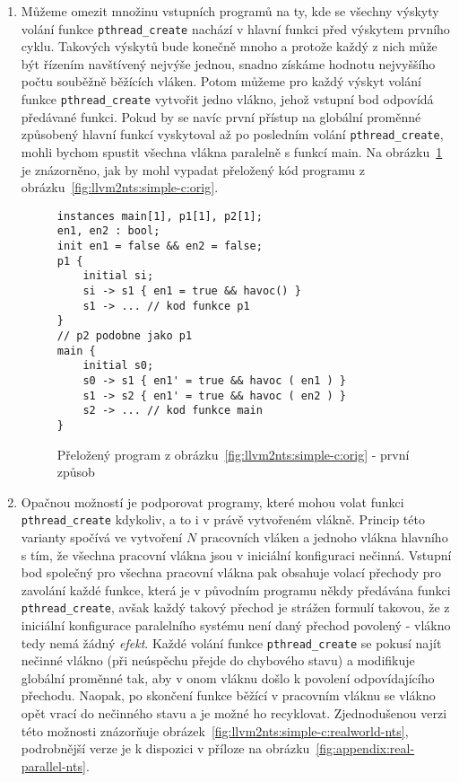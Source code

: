 \documentclass[12pt]{fithesis2}
\begin{document}
\begin{enumerate}
\item \label{subsec:llvm2nts:paralelism-simple} Můžeme omezit množinu vstupních programů na ty, kde se všechny výskyty volání funkce \texttt{pthread\_create} nachází v hlavní funkci před výskytem prvního cyklu. Takových výskytů bude konečně mnoho a protože každý z nich může být řízením navštívený nejvýše jednou, snadno získáme hodnotu nejvyššího počtu souběžně běžících vláken. Potom můžeme pro každý výskyt volání funkce \texttt{pthread\_create} vytvořit jedno vlákno, jehož vstupní bod odpovídá předávané funkci. Pokud by se navíc první přístup na globální proměnné způsobený hlavní funkcí vyskytoval až po posledním volání \texttt{pthread\_create}, mohli bychom spustit všechna vlákna paralelně s funkcí main. Na obrázku~\ref{fig:llvm2nts:simple-c:simple-nts} je znázorněno, jak by mohl vypadat přeložený kód programu z obrázku~\ref{fig:llvm2nts:simple-c:orig}.

\begin{figure}[t]
\begin{lstlisting}
instances main[1], p1[1], p2[1];
en1, en2 : bool;
init en1 = false && en2 = false;
p1 {
	initial si;
	si -> s1 { en1 = true && havoc() }
	s1 -> ... // kod funkce p1
}
// p2 podobne jako p1
main {
	initial s0;
	s0 -> s1 { en1' = true && havoc ( en1 ) }
	s1 -> s2 { en1' = true && havoc ( en2 ) }
	s2 -> ... // kod funkce main
}
\end{lstlisting}
\caption{Přeložený program z obrázku~\ref{fig:llvm2nts:simple-c:orig} - první způsob}
\label{fig:llvm2nts:simple-c:simple-nts}
\end{figure}

\item \label{subsec:llvm2nts:paralelism-complex}Opačnou možností je podporovat programy, které mohou volat funkci \texttt{pthread\_create} kdykoliv, a to i v právě vytvořeném vlákně. Princip této varianty spočívá ve vytvoření $N$ pracovních vláken a jednoho vlákna hlavního s tím, že všechna pracovní vlákna jsou v iniciální konfiguraci nečinná. Vstupní bod společný pro všechna pracovní vlákna pak obsahuje volací přechody pro zavolání každé funkce, která je v původním programu někdy předávána funkci \texttt{pthread\_create}, avšak každý takový přechod je strážen formulí takovou, že z iniciální konfigurace paralelního systému není daný přechod povolený - vlákno tedy nemá žádný \textit{efekt}. Každé volání funkce \texttt{pthread\_create} se pokusí najít nečinné vlákno (při neúspěchu přejde do chybového stavu) a modifikuje globální proměnné tak, aby v onom vláknu došlo k povolení odpovídajícího přechodu. Naopak, po skončení funkce běžící v pracovním vláknu se vlákno opět vrací do nečinného stavu a je možné ho recyklovat. Zjednodušenou verzi této možnosti znázorňuje obrázek~\ref{fig:llvm2nts:simple-c:realworld-nts}, podrobnější verze je k dispozici v příloze na obrázku~\ref{fig:appendix:real-parallel-nts}.
\end{enumerate}
\end{document}
